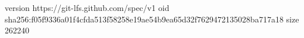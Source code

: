 version https://git-lfs.github.com/spec/v1
oid sha256:f05f9336a01f4cfda513f58258e19ae54b9ea65d32f7629472135028ba717a18
size 262240
